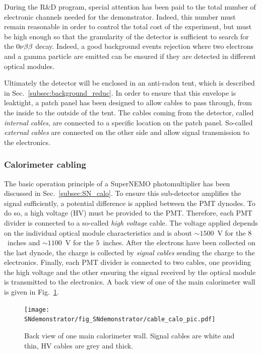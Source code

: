 During the R\&D program, special attention has been paid to the total number of electronic channels needed for the demonstrator.
Indeed, this number must remain reasonable in order to control the total cost of the experiment, but must be high enough so that the granularity of the detector is sufficient to search for the $0\nu\beta\beta$ decay.
Indeed, a good background events rejection where two electrons and a gamma particle are emitted can be ensured if they are detected in different optical modules.

Ultimately the detector will be enclosed in an anti-radon tent, which is described in Sec.~\ref{subsec:background_reduc}.
In order to ensure that this envelope is leaktight, a patch panel has been designed to allow cables to pass through, from the inside to the outside of the tent.
The cables coming from the detector, called \emph{internal cables}, are connected to a specific location on the patch panel.
So-called \emph{external cables} are connected on the other side and allow signal transmission to the electronics.

\subsubsection*{Calorimeter cabling}

The basic operation principle of a SuperNEMO photomultiplier has been discussed in Sec.~\ref{subsec:SN_calo}.
To ensure this sub-detector amplifies the signal sufficiently, a potential difference is applied between the PMT dynodes.
To do so, a high voltage (HV) must be provided to the PMT.
Therefore, each PMT divider is connected to a so-called \emph{high voltage} cable.
The voltage applied depends on the individual optical module characteristics and is about $\sim1500$~V for the $8$~inches and $\sim1100$~V for the $5$~inches.
After the electrons have been collected on the last dynode, the charge is collected by \emph{signal cables} sending the charge to the electronics.
Finally, each PMT divider is connected to two cables, one providing the high voltage and the other ensuring the signal received by the optical module is transmitted to the electronics.
A back view of one of the main calorimeter wall is given in Fig.~\ref{fig:calo_cabling_pic}.
\begin{figure}[h]
  \centering
  \texttt{[image: SNdemonstrator/fig\_SNdemonstrator/cable\_calo\_pic.pdf]}
  \caption{Back view of one main calorimeter wall.
    Signal cables are white and thin, HV cables are grey and thick.
    \label{fig:calo_cabling_pic}}
\end{figure}

